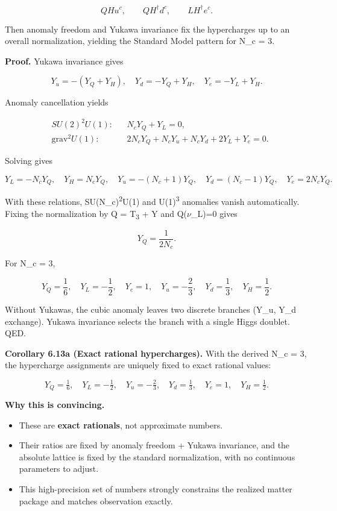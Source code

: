 \[
Q H u^c,\qquad Q H^\dagger d^c,\qquad L H^\dagger e^c.
\]

Then anomaly freedom and Yukawa invariance fix the hypercharges up to an overall normalization, yielding the Standard Model pattern for N\_c = 3.

\textbf{Proof.} Yukawa invariance gives

\[
Y_u = -(Y_Q + Y_H),\quad
Y_d = -Y_Q + Y_H,\quad
Y_e = -Y_L + Y_H.
\]

Anomaly cancellation yields

\[
\begin{aligned}
&SU(2)^2 U(1): && N_c Y_Q + Y_L = 0,\\
&\mathrm{grav}^2 U(1): && 2 N_c Y_Q + N_c Y_u + N_c Y_d + 2 Y_L + Y_e = 0.
\end{aligned}
\]

Solving gives

\[
Y_L = -N_c Y_Q,\quad
Y_H = N_c Y_Q,\quad
Y_u = -(N_c + 1) Y_Q,\quad
Y_d = (N_c - 1) Y_Q,\quad
Y_e = 2 N_c Y_Q.
\]

With these relations, SU(N\_c)\textsuperscript{2}U(1) and U(1)\textsuperscript{3} anomalies vanish automatically. Fixing the normalization by Q = T\textsubscript{3} + Y and Q(\ensuremath{\nu}\_L)=0 gives

\[
Y_Q = \frac{1}{2 N_c}.
\]

For N\_c = 3,

\[
Y_Q = \frac{1}{6},\quad Y_L = -\frac{1}{2},\quad Y_e = 1,\quad
Y_u = -\frac{2}{3},\quad Y_d = \frac{1}{3},\quad Y_H = \frac{1}{2}.
\]

Without Yukawas, the cubic anomaly leaves two discrete branches (Y\_u, Y\_d exchange). Yukawa invariance selects the branch with a single Higgs doublet. QED.

\textbf{Corollary 6.13a (Exact rational hypercharges).} With the derived N\_c = 3, the hypercharge assignments are uniquely fixed to exact rational values:

\[
Y_Q = \tfrac{1}{6}, \quad
Y_L = -\tfrac{1}{2}, \quad
Y_u = -\tfrac{2}{3}, \quad
Y_d = \tfrac{1}{3}, \quad
Y_e = 1, \quad
Y_H = \tfrac{1}{2}.
\]

\textbf{Why this is convincing.}

\begin{itemize}
\tightlist
\item
  These are \textbf{exact rationals}, not approximate numbers.
\item
  Their ratios are fixed by anomaly freedom + Yukawa invariance, and the absolute lattice is fixed by the standard normalization, with no continuous parameters to adjust.
\item
  This high-precision set of numbers strongly constrains the realized matter package and matches observation exactly.
\end{itemize}

